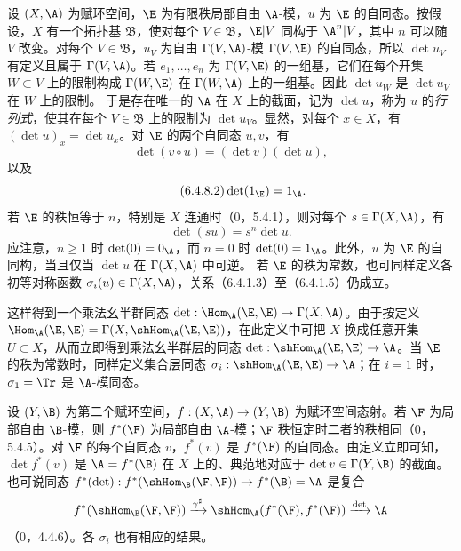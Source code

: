 设 $(X,\A)$ 为赋环空间，$\E$ 为有限秩局部自由 $\A$-模，$u$ 为 $\E$ 的自同态。按假设，$X$ 有一个拓扑基 $\mathfrak B$，使对每个 $V\in\mathfrak B$，$\E|V$ 同构于 $\A^n|V$，其中 $n$ 可以随 $V$ 改变。对每个 $V\in\mathfrak B$，$u_V$ 为自由 $\Gamma(V,\A)$-模 $\Gamma(V,\E)$ 的自同态，所以 $\det u_V$ 有定义且属于 $\Gamma(V,\A)$。若 $e_1,\ldots,e_n$ 为 $\Gamma(V,\E)$ 的一组基，它们在每个开集 $W\subset V$ 上的限制构成 $\Gamma(W,\E)$ 在 $\Gamma(W,\A)$ 上的一组基。因此 $\det u_W$ 是 $\det u_V$ 在 $W$ 上的限制。
于是存在唯一的 $\A$ 在 $X$ 上的截面，记为 $\det u$，称为 $u$ 的\emph{行列式}，使其在每个 $V\in\mathfrak B$ 上的限制为 $\det u_V$。显然，对每个 $x\in X$，有 $(\det u)_x=\det u_x$。对 $\E$ 的两个自同态 $u,v$，有
\begin{equation}\tag{6.4.8.1}
\det(v\circ u)=(\det v)(\det u),
\end{equation}
以及
\begin{equation}\tag{6.4.8.2}
\det(1_\E)=1_\A.
\end{equation}
若 $\E$ 的秩恒等于 $n$，特别是 $X$ 连通时（0，5.4.1），则对每个 $s\in\Gamma(X,\A)$，有
\begin{equation}\tag{6.4.8.3}
\det(su)=s^n\det u.
\end{equation}
应注意，$n\geq1$ 时 $\det(0)=0_\A$，而 $n=0$ 时 $\det(0)=1_\A$。此外，$u$ 为 $\E$ 的自同构，当且仅当 $\det u$ 在 $\Gamma(X,\A)$ 中可逆。
若 $\E$ 的秩为常数，也可同样定义各初等对称函数 $\sigma_i(u)\in\Gamma(X,\A)$，关系（6.4.1.3）至（6.4.1.5）仍成立。

这样得到一个乘法幺半群同态
$\det:\Hom_\A(\E,\E)\to\Gamma(X,\A)$。由于按定义
$\Hom_\A(\E,\E)=\Gamma(X,\shHom_\A(\E,\E))$，在此定义中可把 $X$ 换成任意开集 $U\subset X$，从而立即得到乘法幺半群层的同态
$\det:\shHom_\A(\E,\E)\to\A$。当 $\E$ 的秩为常数时，同样定义集合层同态 $\sigma_i:\shHom_\A(\E,\E)\to\A$；在 $i=1$ 时，$\sigma_1=\Tr$ 是 $\A$-模同态。

设 $(Y,\B)$ 为第二个赋环空间，$f:(X,\A)\to(Y,\B)$ 为赋环空间态射。若 $\F$ 为局部自由 $\B$-模，则 $f^*(\F)$ 为局部自由 $\A$-模；$\F$ 秩恒定时二者的秩相同（0，5.4.5）。对 $\F$ 的每个自同态 $v$，$f^*(v)$ 是 $f^*(\F)$ 的自同态。由定义立即可知，$\det f^*(v)$ 是 $\A=f^*(\B)$ 在 $X$ 上的、典范地对应于 $\det v\in\Gamma(Y,\B)$ 的截面。也可说同态
$f^*(\det):f^*(\shHom_\B(\F,\F))\to f^*(\B)=\A$ 是复合
\[
f^*(\shHom_\B(\F,\F))
\xrightarrow{\gamma^\sharp}\shHom_\A(f^*(\F),f^*(\F))
\xrightarrow{\det}\A
\]
（0，4.4.6）。各 $\sigma_i$ 也有相应的结果。

